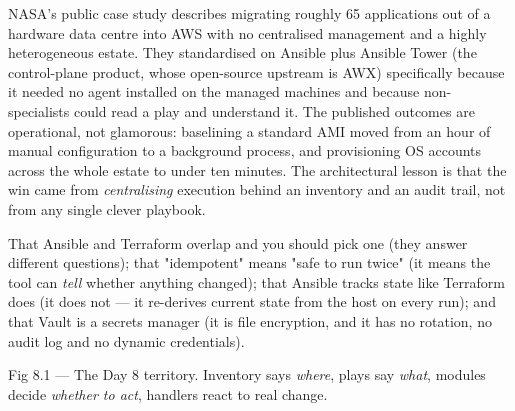  NASA's public case study describes migrating roughly 65 applications out of a hardware data centre into AWS with no centralised management and a highly heterogeneous estate. They standardised on Ansible plus Ansible Tower (the control-plane product, whose open-source upstream is AWX) specifically because it needed no agent installed on the managed machines and because non-specialists could read a play and understand it. The published outcomes are operational, not glamorous: baselining a standard AMI moved from an hour of manual configuration to a background process, and provisioning OS accounts across the whole estate to under ten minutes. The architectural lesson is that the win came from \emph{centralising} execution behind an inventory and an audit trail, not from any single clever playbook.

 That Ansible and Terraform overlap and you should pick one (they answer different questions); that "idempotent" means "safe to run twice" (it means the tool can \emph{tell} whether anything changed); that Ansible tracks state like Terraform does (it does not --- it re-derives current state from the host on every run); and that Vault is a secrets manager (it is file encryption, and it has no rotation, no audit log and no dynamic credentials).


\begin{wbfigure}{Fig 8.1 — The Day 8 territory. Inventory says \emph{where}, plays say \emph{what}, modules decide \emph{whether to act}, handlers react to real change.}
\end{wbfigure}

